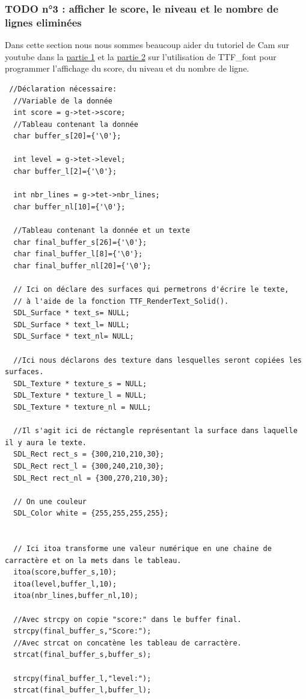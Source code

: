 \documentclass[a4paper,10p]{report}
\begin{document}
\subsubsection{TODO n°3 : afficher le score, le niveau et le nombre de lignes eliminées}
\label{todo3}
Dans cette section nous nous sommes beaucoup aider du tutoriel de Cam sur youtube dans la \href{https://www.youtube.com/watch?v=NQZNHUoba-8}{partie 1} et la \href{https://www.youtube.com/watch?v=LS_eeI-9-pA}{partie 2} sur l'utilisation de TTF\_font pour programmer l'affichage du score, du niveau et du nombre de ligne.
\begin{lstlisting}
 //Déclaration nécessaire:
  //Variable de la donnée
  int score = g->tet->score;
  //Tableau contenant la donnée
  char buffer_s[20]={'\0'};
  
  int level = g->tet->level;
  char buffer_l[2]={'\0'};
  
  int nbr_lines = g->tet->nbr_lines;
  char buffer_nl[10]={'\0'};

  //Tableau contenant la donnée et un texte
  char final_buffer_s[26]={'\0'};
  char final_buffer_l[8]={'\0'};
  char final_buffer_nl[20]={'\0'};

  // Ici on déclare des surfaces qui permetrons d'écrire le texte,
  // à l'aide de la fonction TTF_RenderText_Solid().
  SDL_Surface * text_s= NULL;
  SDL_Surface * text_l= NULL;
  SDL_Surface * text_nl= NULL;

  //Ici nous déclarons des texture dans lesquelles seront copiées les surfaces.
  SDL_Texture * texture_s = NULL;
  SDL_Texture * texture_l = NULL;
  SDL_Texture * texture_nl = NULL;

  //Il s'agit ici de réctangle représentant la surface dans laquelle il y aura le texte.
  SDL_Rect rect_s = {300,210,210,30};
  SDL_Rect rect_l = {300,240,210,30};
  SDL_Rect rect_nl = {300,270,210,30};

  // On une couleur
  SDL_Color white = {255,255,255,255};  
  

  // Ici itoa transforme une valeur numérique en une chaine de carractère et on la mets dans le tableau.
  itoa(score,buffer_s,10);
  itoa(level,buffer_l,10);
  itoa(nbr_lines,buffer_nl,10);

  //Avec strcpy on copie "score:" dans le buffer final.
  strcpy(final_buffer_s,"Score:");
  //Avec strcat on concatène les tableau de carractère.
  strcat(final_buffer_s,buffer_s);
  
  strcpy(final_buffer_l,"level:");
  strcat(final_buffer_l,buffer_l);
  

\end{lstlisting}
\end{document}
